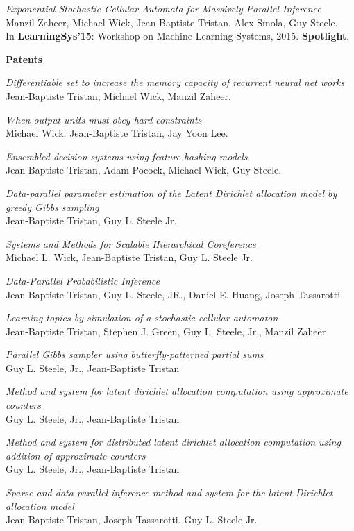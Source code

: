 \documentclass[margin,line]{res}
\begin{document}
\begin{resume}
\emph{Exponential Stochastic Cellular Automata for Massively Parallel Inference}\\
Manzil Zaheer, Michael Wick, Jean-Baptiste Tristan, Alex Smola, Guy Steele.\\
In {\bf LearningSys'15}: Workshop on Machine Learning Systems, 2015. {\bf Spotlight}. 

\newpage
  {\bf {\Large Patents}}

\emph{Differentiable set to increase the memory capacity of recurrent neural net works}\\
Jean-Baptiste Tristan, Michael Wick, Manzil Zaheer.  
  
\emph{When output units must obey hard constraints}\\
Michael Wick, Jean-Baptiste Tristan, Jay Yoon Lee.  
  
\emph{Ensembled decision systems using feature hashing models}\\
Jean-Baptiste Tristan, Adam Pocock, Michael Wick, Guy Steele.

\emph{Data-parallel parameter estimation of the Latent Dirichlet allocation model by greedy Gibbs sampling}\\
Jean-Baptiste Tristan, Guy L. Steele Jr.

\emph{Systems and Methods for Scalable Hierarchical Coreference}\\
Michael L. Wick, Jean-Baptiste Tristan, Guy L. Steele Jr.

\emph{Data-Parallel Probabilistic Inference}\\
Jean-Baptiste Tristan, Guy L. Steele, JR., Daniel E. Huang, Joseph Tassarotti

\emph{Learning topics by simulation of a stochastic cellular automaton}\\
Jean-Baptiste Tristan, Stephen J. Green, Guy L. Steele, Jr., Manzil Zaheer

\emph{Parallel Gibbs sampler using butterfly-patterned partial sums}\\
Guy L. Steele, Jr., Jean-Baptiste Tristan

\emph{Method and system for latent dirichlet allocation computation using approximate counters}\\
Guy L. Steele, Jr., Jean-Baptiste Tristan

\emph{Method and system for distributed latent dirichlet allocation computation using addition of approximate counters}\\
Guy L. Steele, Jr., Jean-Baptiste Tristan

\emph{Sparse and data-parallel inference method and system for the latent Dirichlet allocation model}\\
Jean-Baptiste Tristan, Joseph Tassarotti, Guy L. Steele Jr.




\end{resume}
\end{document}
